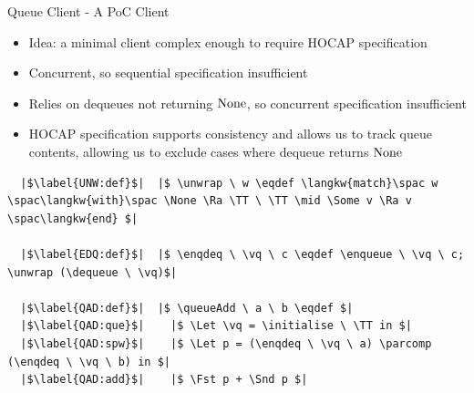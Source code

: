 \documentclass[9pt]{beamer}
\newcommand{\initialise}{\operatorname{initialize}}
\newcommand{\enqueue}{\operatorname{enqueue}}
\newcommand{\dequeue}{\operatorname{dequeue}}
\newcommand{\unwrap}{\operatorname{unwrap}}
\newcommand{\enqdeq}{\operatorname{enqdeq}}
\newcommand{\queueAdd}{\operatorname{queueAdd}}
\newcommand{\parcomp}{\ensuremath{\mathbin{||}}}
\newcommand{\vq}{v_q}
\begin{document}
\begin{frame}[containsverbatim]{Queue Client - A PoC Client}
  \begin{itemize}
    \item Idea: a minimal client complex enough to require HOCAP specification
    \item Concurrent, so sequential specification insufficient
    \item Relies on dequeues not returning $\operatorname{None}$, so concurrent specification insufficient
    \item HOCAP specification supports consistency and allows us to track queue contents, allowing us to exclude cases where dequeue returns $\operatorname{None}$ 
  \end{itemize}
  \begin{verbatim}
  |$\label{UNW:def}$|  |$ \unwrap \ w \eqdef \langkw{match}\spac w \spac\langkw{with}\spac \None \Ra \TT \ \TT \mid \Some v \Ra v \spac\langkw{end} $|
  
  |$\label{EDQ:def}$|  |$ \enqdeq \ \vq \ c \eqdef \enqueue \ \vq \ c; \unwrap (\dequeue \ \vq)$|
  
  |$\label{QAD:def}$|  |$ \queueAdd \ a \ b \eqdef $|
  |$\label{QAD:que}$|    |$ \Let \vq = \initialise \ \TT in $|
  |$\label{QAD:spw}$|    |$ \Let p = (\enqdeq \ \vq \ a) \parcomp (\enqdeq \ \vq \ b) in $|
  |$\label{QAD:add}$|    |$ \Fst p + \Snd p $|
  \end{verbatim}
\end{frame}
\end{document}
